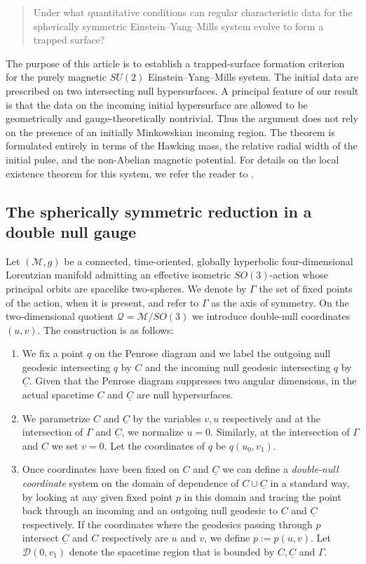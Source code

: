 \documentclass{article}[11pt]
\newcommand{\Cbar}{\underline{C}}
\numberwithin{equation}{section}
\begin{document}
\begin{quote}
Under what quantitative conditions can regular characteristic data for the
spherically symmetric Einstein--Yang--Mills system evolve to form a trapped
surface?
\end{quote}

\noindent The purpose of this article is to establish a trapped-surface formation
criterion for the purely magnetic \(SU(2)\) Einstein--Yang--Mills system.
The initial data are prescribed on two intersecting null hypersurfaces. A
principal feature of our result is that the data on the incoming initial
hypersurface are allowed to be geometrically and gauge-theoretically
nontrivial. Thus the argument does not rely on the presence of an initially
Minkowskian incoming region. The theorem is formulated entirely in terms of
the Hawking mass, the relative radial width of the initial pulse, and the
non-Abelian magnetic potential. For details on the local existence theorem for this system, we refer the reader to \cite{Li_Wang}.

\subsection{The spherically symmetric reduction in a double null gauge}

Let \((\mathcal M,g)\) be a connected, time-oriented, globally hyperbolic
four-dimensional Lorentzian manifold admitting an effective isometric
\(SO(3)\)-action whose principal orbits are spacelike two-spheres. We denote
by \(\Gamma\) the set of fixed points of the action, when it is present, and
refer to \(\Gamma\) as the axis of symmetry. On the two-dimensional quotient
\(\mathcal Q=\mathcal M/SO(3)\) we introduce double-null coordinates
\((u,v)\). The construction is as follows:

\begin{enumerate}
\item We fix a point $q$ on the Penrose diagram and we label the outgoing null geodesic intersecting $q$ by $C$ and the incoming null geodesic intersecting $q$ by $\Cbar$. Given that the Penrose diagram suppresses two angular dimensions, in the actual spacetime $C$ and $\Cbar$ are null hypersurfaces.
 \item We parametrize $C$ and $\Cbar$ by the variables $v, u$ respectively and at the intersection of $\Gamma$ and $\Cbar$, we normalize $u=0$. Similarly, at the intersection of $\Gamma$ and $C$ we set $v=0$. Let the coordinates of $q$ be $q(u_0,v_1)$. 

 \item Once coordinates have been fixed on $C$ and $\Cbar$ we can define a \textit{double-null coordinate} system on the domain of dependence of $C\cup \Cbar$ in a standard way, by looking at any given fixed point $p$ in this domain and tracing the point back through an incoming and an outgoing null geodesic to $C$ and $\Cbar$ respectively. If the coordinates where the geodesics passing through $p$ intersect $\Cbar$ and $C$ respectively are $u$ and $v$, we define $p:=p(u,v)$. Let $\mathcal{D}(0,v_1)$ denote the spacetime region that is bounded by $C,\Cbar$ and $\Gamma$.
\end{enumerate}
\end{document}

